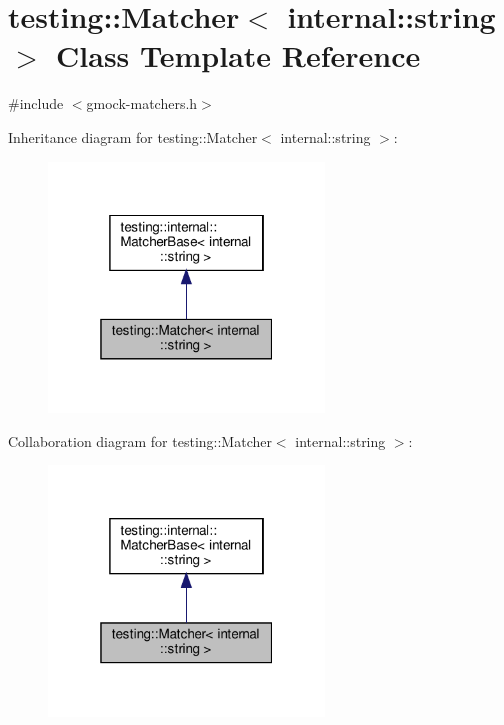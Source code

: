 \hypertarget{classtesting_1_1_matcher_3_01internal_1_1string_01_4}{}\section{testing\+:\+:Matcher$<$ internal\+:\+:string $>$ Class Template Reference}
\label{classtesting_1_1_matcher_3_01internal_1_1string_01_4}


{\ttfamily \#include $<$gmock-\/matchers.\+h$>$}



Inheritance diagram for testing\+:\+:Matcher$<$ internal\+:\+:string $>$\+:
\nopagebreak
\begin{figure}[H]
\begin{center}
\leavevmode
\includegraphics[width=208pt]{classtesting_1_1_matcher_3_01internal_1_1string_01_4__inherit__graph}
\end{center}
\end{figure}


Collaboration diagram for testing\+:\+:Matcher$<$ internal\+:\+:string $>$\+:
\nopagebreak
\begin{figure}[H]
\begin{center}
\leavevmode
\includegraphics[width=208pt]{classtesting_1_1_matcher_3_01internal_1_1string_01_4__coll__graph}
\end{center}
\end{figure}
